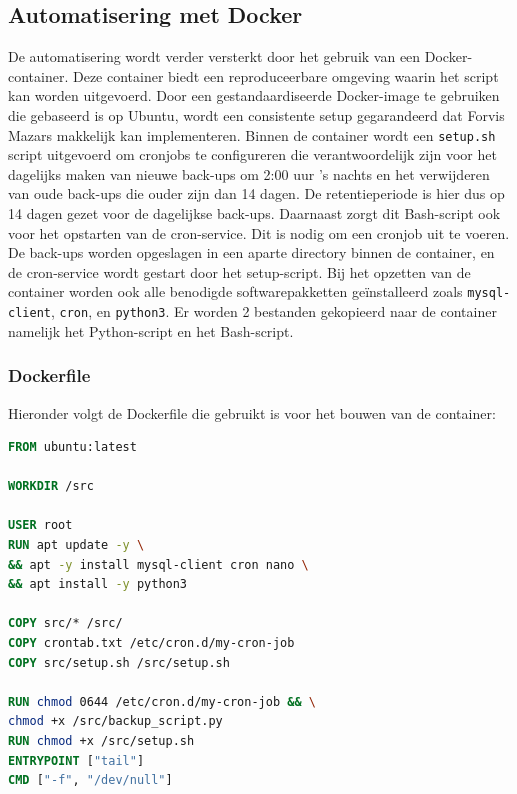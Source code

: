 \subsection{Automatisering met Docker}
De automatisering wordt verder versterkt door het gebruik van een Docker-container. Deze container biedt een reproduceerbare omgeving waarin het script kan worden uitgevoerd. Door een gestandaardiseerde Docker-image te gebruiken die gebaseerd is op Ubuntu, wordt een consistente setup gegarandeerd dat Forvis Mazars makkelijk kan implementeren. Binnen de container wordt een \texttt{setup.sh} script uitgevoerd om cronjobs te configureren die verantwoordelijk zijn voor het dagelijks maken van nieuwe back-ups om 2:00 uur 's nachts en het verwijderen van oude back-ups die ouder zijn dan 14 dagen. De retentieperiode is hier dus op 14 dagen gezet voor de dagelijkse back-ups. Daarnaast zorgt dit Bash-script ook voor het opstarten van de cron-service. Dit is nodig om een cronjob uit te voeren. De back-ups worden opgeslagen in een aparte directory binnen de container, en de cron-service wordt gestart door het setup-script. Bij het opzetten van de container  worden ook alle benodigde softwarepakketten geïnstalleerd zoals \texttt{mysql-client}, \texttt{cron}, en \texttt{python3}. Er worden 2 bestanden gekopieerd naar de container namelijk het Python-script en het Bash-script.

\subsubsection{Dockerfile}
Hieronder volgt de Dockerfile die gebruikt is voor het bouwen van de container:
\begin{lstlisting}[language=Dockerfile, caption=Dockerfile voor de back-upcontainer]
FROM ubuntu:latest

WORKDIR /src

USER root
RUN apt update -y \
&& apt -y install mysql-client cron nano \
&& apt install -y python3

COPY src/* /src/
COPY crontab.txt /etc/cron.d/my-cron-job
COPY src/setup.sh /src/setup.sh

RUN chmod 0644 /etc/cron.d/my-cron-job && \
chmod +x /src/backup_script.py 
RUN chmod +x /src/setup.sh
ENTRYPOINT ["tail"]
CMD ["-f", "/dev/null"]
\end{lstlisting}

